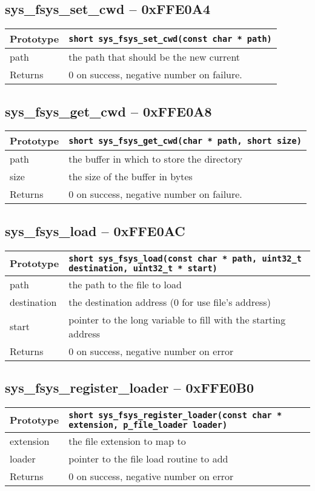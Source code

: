 \subsection*{sys\_fsys\_set\_cwd -- 0xFFE0A4}
\begin{tabular}{|l||l|} \hline
Prototype & \lstinline!short sys_fsys_set_cwd(const char * path)! \\ \hline
path & the path that should be the new current \\ \hline
Returns & 0 on success, negative number on failure. \\ \hline
\end{tabular}

\subsection*{sys\_fsys\_get\_cwd -- 0xFFE0A8}
\begin{tabular}{|l||l|} \hline
Prototype & \lstinline!short sys_fsys_get_cwd(char * path, short size)! \\ \hline
path & the buffer in which to store the directory \\ \hline
size & the size of the buffer in bytes \\ \hline
Returns & 0 on success, negative number on failure. \\ \hline
\end{tabular}

\subsection*{sys\_fsys\_load -- 0xFFE0AC}
\begin{tabular}{|l||l|} \hline
Prototype & \lstinline!short sys_fsys_load(const char * path, uint32_t destination, uint32_t * start)! \\ \hline
path & the path to the file to load \\ \hline
destination & the destination address (0 for use file's address) \\ \hline
start & pointer to the long variable to fill with the starting address \\ \hline
Returns & 0 on success, negative number on error \\ \hline
\end{tabular}

\subsection*{sys\_fsys\_register\_loader -- 0xFFE0B0}
\begin{tabular}{|l||l|} \hline
Prototype & \lstinline!short sys_fsys_register_loader(const char * extension, p_file_loader loader)! \\ \hline
extension & the file extension to map to \\ \hline
loader & pointer to the file load routine to add \\ \hline
Returns & 0 on success, negative number on error \\ \hline
\end{tabular}


